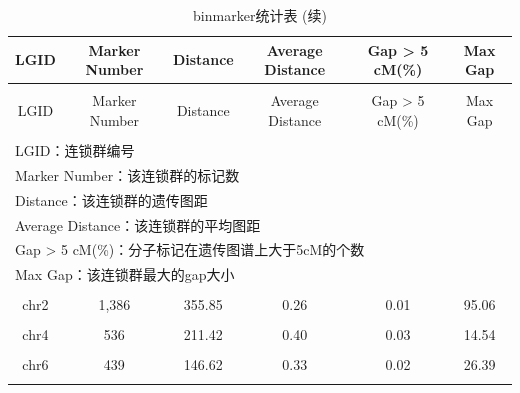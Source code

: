 \documentclass[
  a4paper,
  titlepage]{article}
\begin{document}
\begin{longtable}[t]{cccccc}
\caption{\label{tab:lg-table}binmarker统计表}\\
\toprule
LGID & Marker Number & Distance & Average Distance & Gap > 5 cM(\%) & Max Gap\\
\midrule
\endfirsthead
\caption[]{\label{tab:lg-table}binmarker统计表 (续)}\\
\toprule
LGID & Marker Number & Distance & Average Distance & Gap > 5 cM(\%) & Max Gap\\
\midrule
\endhead
\hline
\endfoot
\bottomrule
\multicolumn{6}{l}{\rule{0pt}{1em}\textit{注：}}\\
\multicolumn{6}{l}{\rule{0pt}{1em}LGID：连锁群编号}\\
\multicolumn{6}{l}{\rule{0pt}{1em}Marker Number：该连锁群的标记数}\\
\multicolumn{6}{l}{\rule{0pt}{1em}Distance：该连锁群的遗传图距}\\
\multicolumn{6}{l}{\rule{0pt}{1em}Average Distance：该连锁群的平均图距}\\
\multicolumn{6}{l}{\rule{0pt}{1em}Gap > 5 cM(\%)：分子标记在遗传图谱上大于5cM的个数}\\
\multicolumn{6}{l}{\rule{0pt}{1em}Max Gap：该连锁群最大的gap大小}\\
\endlastfoot
\cellcolor{gray!6}{chr1} & \cellcolor{gray!6}{733} & \cellcolor{gray!6}{262.19} & \cellcolor{gray!6}{0.36} & \cellcolor{gray!6}{0.01} & \cellcolor{gray!6}{25.86}\\
 
chr2 & 1,386 & 355.85 & 0.26 & 0.01 & 95.06\\
 
\cellcolor{gray!6}{chr3} & \cellcolor{gray!6}{721} & \cellcolor{gray!6}{250.25} & \cellcolor{gray!6}{0.35} & \cellcolor{gray!6}{0.02} & \cellcolor{gray!6}{22.44}\\
 
chr4 & 536 & 211.42 & 0.40 & 0.03 & 14.54\\
 
\cellcolor{gray!6}{chr5} & \cellcolor{gray!6}{320} & \cellcolor{gray!6}{126.80} & \cellcolor{gray!6}{0.40} & \cellcolor{gray!6}{0.01} & \cellcolor{gray!6}{25.15}\\
 
chr6 & 439 & 146.62 & 0.33 & 0.02 & 26.39\\
 
\cellcolor{gray!6}{chr7} & \cellcolor{gray!6}{547} & \cellcolor{gray!6}{132.66} & \cellcolor{gray!6}{0.24} & \cellcolor{gray!6}{0.01} & \cellcolor{gray!6}{50.24}\\
 

\end{longtable}
\end{document}

